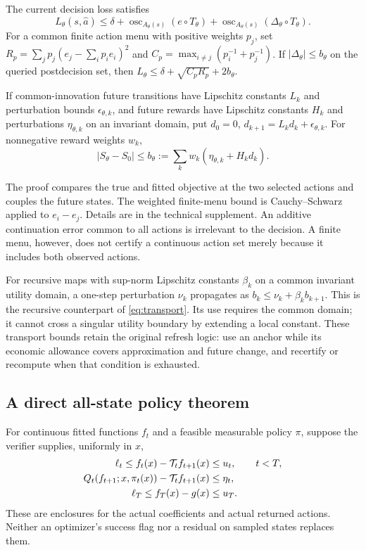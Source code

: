 \documentclass[ecta,nameyear,draft]{econsocart}
\begin{document}
\begin{proposition}\label{prop:center}
The current decision loss satisfies
\begin{equation}\label{eq:osc}
 L_\theta(s,\widehat a)\leq\delta+
 \operatorname{osc}_{A_\theta(s)}(e\circ T_\theta)+
 \operatorname{osc}_{A_\theta(s)}(\Delta_\theta\circ T_\theta).
\end{equation}
For a common finite action menu with positive weights $p_j$, set
$R_p=\sum_jp_j(e_j-\sum_ip_ie_i)^2$ and
$C_p=\max_{i\ne j}(p_i^{-1}+p_j^{-1})$. If $|\Delta_\theta|\leq b_\theta$ on the queried postdecision set, then
$L_\theta\leq\delta+\sqrt{C_pR_p}+2b_\theta$.

If common-innovation future transitions have Lipschitz constants $L_k$ and perturbation bounds $\epsilon_{\theta,k}$, and future rewards have Lipschitz constants $H_k$ and perturbations $\eta_{\theta,k}$ on an invariant domain, put $d_0=0$, $d_{k+1}=L_kd_k+\epsilon_{\theta,k}$. For nonnegative reward weights $w_k$,
\begin{equation}\label{eq:transport}
 |S_\theta-S_0|\leq b_\theta:=\sum_kw_k(\eta_{\theta,k}+H_kd_k).
\end{equation}
\end{proposition}

The proof compares the true and fitted objective at the two selected actions and couples the future states. The weighted finite-menu bound is Cauchy--Schwarz applied to $e_i-e_j$. Details are in the technical supplement. An additive continuation error common to all actions is irrelevant to the decision. A finite menu, however, does not certify a continuous action set merely because it includes both observed actions.

For recursive maps with sup-norm Lipschitz constants $\beta_k$ on a common invariant utility domain, a one-step perturbation $\nu_k$ propagates as $b_k\leq\nu_k+\beta_kb_{k+1}$. This is the recursive counterpart of \eqref{eq:transport}. Its use requires the common domain; it cannot cross a singular utility boundary by extending a local constant. These transport bounds retain the original refresh logic: use an anchor while its economic allowance covers approximation and future change, and recertify or recompute when that condition is exhausted.

\subsection{A direct all-state policy theorem}
For continuous fitted functions $f_t$ and a feasible measurable policy $\pi$, suppose the verifier supplies, uniformly in $x$,
\begin{align}\label{eq:residual}
 \ell_t\leq f_t(x)-\mathcal T_tf_{t+1}(x)&\leq u_t,\qquad t<T,\\
 Q_t(f_{t+1};x,\pi_t(x))-\mathcal T_tf_{t+1}(x)&\leq\eta_t,\notag\\
 \ell_T\leq f_T(x)-g(x)&\leq u_T.\notag
\end{align}
These are enclosures for the actual coefficients and actual returned actions. Neither an optimizer's success flag nor a residual on sampled states replaces them.
\end{document}
